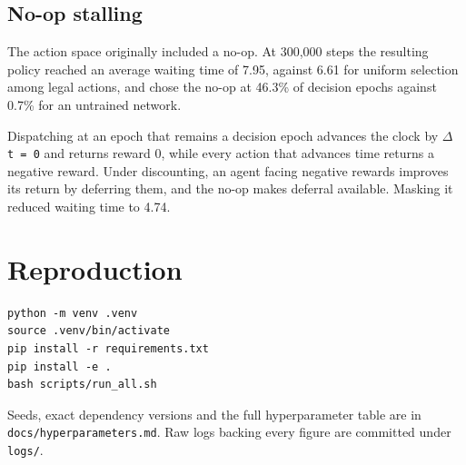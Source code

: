 \subsection{No-op stalling}\label{the-no-op-taught-the-agent-to-stall}

The action space originally included a no-op. At 300,000 steps the resulting policy reached an
average waiting time of 7.95, against 6.61 for uniform selection among legal actions,
and chose the no-op at 46.3\% of decision epochs against 0.7\% for an untrained network.

Dispatching at an epoch that remains a decision
epoch advances the clock by \texttt{$\Delta$t\ =\ 0} and returns reward 0, while every action that advances time
returns a negative reward. Under discounting, an agent facing negative rewards improves its return
by deferring them, and the no-op makes deferral available. Masking it reduced waiting time to 4.74.

\section{Reproduction}\label{reproduction}

\begin{verbatim}
python -m venv .venv
source .venv/bin/activate
pip install -r requirements.txt
pip install -e .
bash scripts/run_all.sh
\end{verbatim}

Seeds, exact dependency versions and the full hyperparameter table are in
\texttt{docs/hyperparameters.md}. Raw logs backing every figure are committed under \texttt{logs/}.
